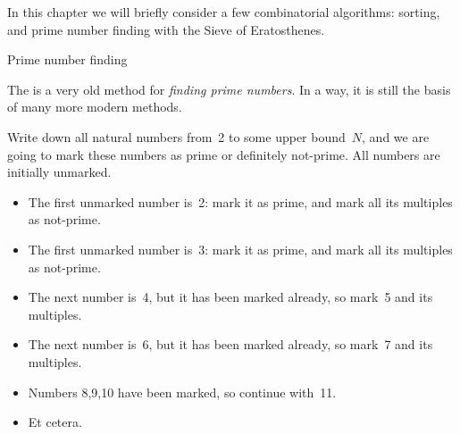 

In this chapter we will briefly consider a few combinatorial algorithms:
sorting, and prime number finding with the Sieve of Eratosthenes.



 {Prime number finding}

The  is a very old method for
\emph{finding prime numbers}.
In a way, it is still the basis of many more modern methods.

Write down all natural numbers from~2 to some upper bound~$N$,
and we are going to mark these numbers as prime or definitely not-prime.
All numbers are initially unmarked.
\begin{itemize}
\item The first unmarked number is~2: mark it as prime, and mark all its
  multiples as not-prime.
\item The first unmarked number is~3: mark it as prime, and mark all its
  multiples as not-prime.
\item The next number is~4, but it has been marked already, so mark~5
  and its multiples.
\item The next number is~6, but it has been marked already, so mark~7
  and its multiples.
\item Numbers 8,9,10 have been marked, so continue with~11.
\item Et cetera.
\end{itemize}

